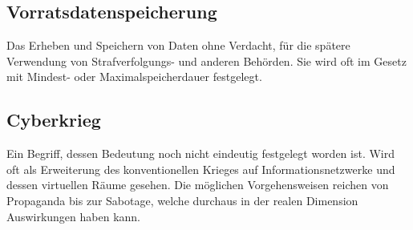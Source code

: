 	\subsection{Vorratsdatenspeicherung}
	  Das Erheben und Speichern von Daten ohne Verdacht, für die spätere 
	  Verwendung von Strafverfolgungs- und anderen Behörden. Sie wird oft im 
	  Gesetz mit Mindest- oder Maximalspeicherdauer festgelegt. 
	
	\subsection{Cyberkrieg}
	  Ein Begriff, dessen Bedeutung noch nicht eindeutig festgelegt worden 
	  ist. Wird oft als Erweiterung des konventionellen Krieges auf 
	  Informationsnetzwerke und dessen virtuellen Räume gesehen. Die 
	  möglichen Vorgehensweisen reichen von Propaganda bis zur Sabotage, 
	  welche durchaus in der realen Dimension Auswirkungen haben kann. 
